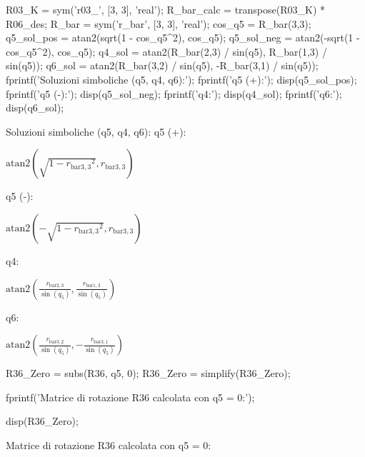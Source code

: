 \documentclass[11pt, a4paper]{article}
\begin{document}
\begin{matlabcode}
R03_K = sym('r03_', [3, 3], 'real');
R_bar_calc = transpose(R03_K) * R06_des;
R_bar = sym('r_bar', [3, 3], 'real');
cos_q5 = R_bar(3,3);
q5_sol_pos = atan2(sqrt(1 - cos_q5^2), cos_q5);
q5_sol_neg = atan2(-sqrt(1 - cos_q5^2), cos_q5);
q4_sol = atan2(R_bar(2,3) / sin(q5), R_bar(1,3) / sin(q5));
q6_sol = atan2(R_bar(3,2) / sin(q5), -R_bar(3,1) / sin(q5));
fprintf('Soluzioni simboliche (q5, q4, q6):\n');
fprintf('q5 (+):\n'); disp(q5_sol_pos);
fprintf('q5 (-):\n'); disp(q5_sol_neg);
fprintf('q4:\n'); disp(q4_sol);
fprintf('q6:\n'); disp(q6_sol);
\end{matlabcode}
\begin{matlaboutput}
Soluzioni simboliche (q5, q4, q6):
q5 (+):
\end{matlaboutput}
\begin{matlabsymbolicoutput}
$\displaystyle \textrm{atan2}\left(\sqrt{1-{r_{\textrm{bar3},3}}^2}, r_{\textrm{bar3},3}\right)$
\end{matlabsymbolicoutput}
\begin{matlaboutput}
q5 (-):
\end{matlaboutput}
\begin{matlabsymbolicoutput}
$\displaystyle \textrm{atan2}\left(-\sqrt{1-{r_{\textrm{bar3},3}}^2}, r_{\textrm{bar3},3}\right)$
\end{matlabsymbolicoutput}
\begin{matlaboutput}
q4:
\end{matlaboutput}
\begin{matlabsymbolicoutput}
$\displaystyle \textrm{atan2}\left(\frac{r_{\textrm{bar2},3}}{\sin(q_5)}, \frac{r_{\textrm{bar1},3}}{\sin(q_5)}\right)$
\end{matlabsymbolicoutput}
\begin{matlaboutput}
q6:
\end{matlaboutput}
\begin{matlabsymbolicoutput}
$\displaystyle \textrm{atan2}\left(\frac{r_{\textrm{bar3},2}}{\sin(q_5)}, -\frac{r_{\textrm{bar3},1}}{\sin(q_5)}\right)$
\end{matlabsymbolicoutput}



\begin{matlabcode}
R36_Zero = subs(R36, q5, 0);
R36_Zero = simplify(R36_Zero);

fprintf('Matrice di rotazione R36 calcolata con q5 = 0:\n');

disp(R36_Zero);
\end{matlabcode}
\begin{matlaboutput}
Matrice di rotazione R36 calcolata con q5 = 0:
\end{matlaboutput}
\end{document}
